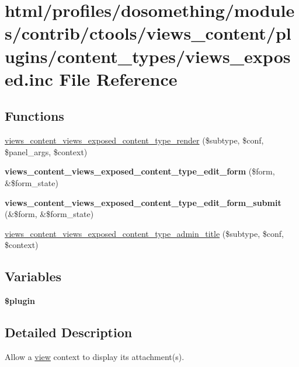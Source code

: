 \hypertarget{views__exposed_8inc}{
\section{html/profiles/dosomething/modules/contrib/ctools/views\_\-content/plugins/content\_\-types/views\_\-exposed.inc File Reference}
\label{views__exposed_8inc}
}
\subsection*{Functions}
\begin{DoxyCompactItemize}
\item 
\hyperlink{views__exposed_8inc_a21bf54aed443831f96497c0808a74aeb}{views\_\-content\_\-views\_\-exposed\_\-content\_\-type\_\-render} (\$subtype, \$conf, \$panel\_\-args, \$context)
\item 
\hypertarget{views__exposed_8inc_ac1a0be2a10f95fbd540788b245871f17}{
{\bfseries views\_\-content\_\-views\_\-exposed\_\-content\_\-type\_\-edit\_\-form} (\$form, \&\$form\_\-state)}
\label{views__exposed_8inc_ac1a0be2a10f95fbd540788b245871f17}

\item 
\hypertarget{views__exposed_8inc_acb50b2d103f55fe5f45a57cec1af36f9}{
{\bfseries views\_\-content\_\-views\_\-exposed\_\-content\_\-type\_\-edit\_\-form\_\-submit} (\&\$form, \&\$form\_\-state)}
\label{views__exposed_8inc_acb50b2d103f55fe5f45a57cec1af36f9}

\item 
\hyperlink{views__exposed_8inc_a90e7230184d5e1f5e99dba0dedd4d139}{views\_\-content\_\-views\_\-exposed\_\-content\_\-type\_\-admin\_\-title} (\$subtype, \$conf, \$context)
\end{DoxyCompactItemize}
\subsection*{Variables}
\begin{DoxyCompactItemize}
\item 
{\bfseries \$plugin}
\end{DoxyCompactItemize}


\subsection{Detailed Description}
Allow a \hyperlink{classview}{view} context to display its attachment(s). 

